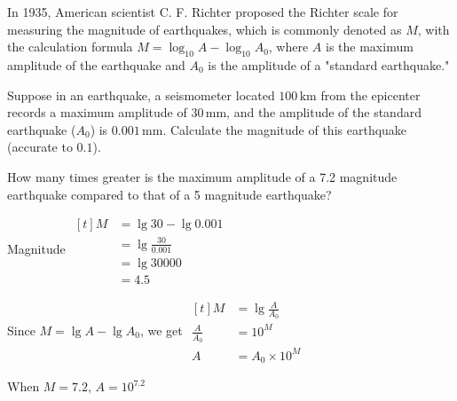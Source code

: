 \documentclass{report}
\begin{document}
        \begin{question}
            In 1935, American scientist C. F. Richter proposed the Richter scale for measuring the magnitude of earthquakes, which is commonly denoted as \( M \), with the calculation formula \( M = \log_{10} A - \log_{10} A_0 \), where \( A \) is the maximum amplitude of the earthquake and \( A_0 \) is the amplitude of a "standard earthquake."
            \begin{tasks}[label=(\alph*)]
                \task Suppose in an earthquake, a seismometer located \( 100 \, \text{km} \) from the epicenter records a maximum amplitude of \( 30 \, \text{mm} \), and the amplitude of the standard earthquake (\( A_0 \)) is \( 0.001 \, \text{mm} \). Calculate the magnitude of this earthquake (accurate to \( 0.1 \)).

                \task How many times greater is the maximum amplitude of a 7.2 magnitude earthquake compared to that of a 5 magnitude earthquake?
            \end{tasks}

            \sol{}
            \begin{tasks}[label=(\alph*)]
                \task Magnitude $\begin{aligned}[t]
                    M & =\lg 30-\lg 0.001 \\
                    & =\lg \frac{30}{0.001} \\
                    & =\lg 30000 \\
                    & =4.5
                    \end{aligned}$

                    \task Since $M = \lg A - \lg A_0$, we get $\begin{aligned}[t]
                        M&=\lg \frac{A}{A_0} \\
                        \frac{A}{A_0}&=10^M \\
                        A&=A_0 \times 10^M
                        \end{aligned}$

                        When $M=7.2$, $A=10^{7.2}$


\end{tasks}
\end{question}
\end{document}
